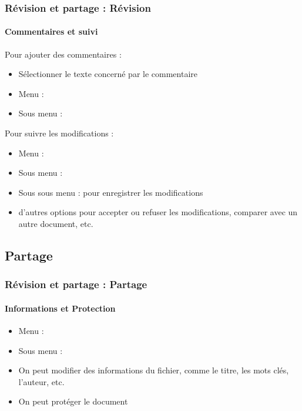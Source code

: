 \documentclass[xcolor=table]{beamer}
\begin{document}
\begin{frame}[t]
\frametitle{Révision et partage : Révision}
\framesubtitle{Commentaires et suivi}

Pour ajouter des commentaires : 

\begin{itemize}
	\item Sélectionner le texte concerné par le commentaire
	\item Menu : 
	\item Sous menu : 
\end{itemize} 

Pour suivre les modifications :

\begin{itemize}
	\item Menu : 
	\item Sous menu : 
	\item Sous sous menu :  pour enregistrer les modifications
	\item d'autres options pour accepter ou refuser les modifications, comparer avec un autre document, etc.
\end{itemize}


\end{frame}




\subsection{Partage}

%
%

\begin{frame}
\frametitle{Révision et partage : Partage}
\framesubtitle{Informations et Protection}

\begin{itemize}
	\item Menu : 
	\item Sous menu : 
	\item On peut modifier des informations du fichier, comme le titre, les mots clés, l'auteur, etc. 
	\item On peut protéger le document
\end{itemize}


\end{frame}
\end{document}
